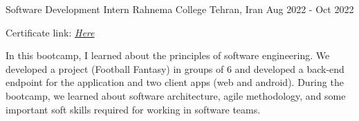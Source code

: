 \begin{cventries}
  \cventry
  {Software Development Intern}
  {Rahnema College}
  {Tehran, Iran}
  {Aug 2022 - Oct 2022}
  {
    \begin{cvitems}
      \item {Certificate link: \href{https://rahnemacollege.com/certificate/mbroughani81ATzvlhQDHBAV_Q}
        {\textit{Here}}}
      \item {In this bootcamp, I learned about the principles of software engineering. We developed a project (Football Fantasy) in groups of 6 and developed a back-end endpoint for the application and two client apps (web and android). During the bootcamp, we learned about software architecture, agile methodology, and some important soft skills required for working in software teams.}
    \end{cvitems}
  }


\end{cventries}

